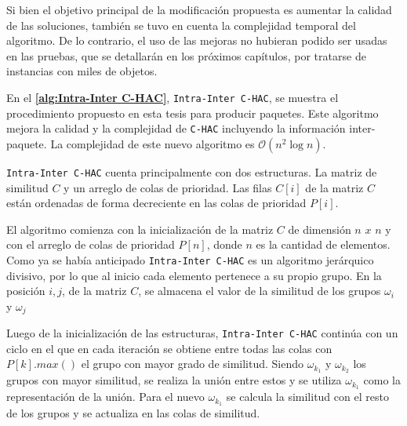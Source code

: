 Si bien el objetivo principal de la modificación propuesta es aumentar la calidad de las soluciones, también se tuvo en cuenta la complejidad temporal del algoritmo. De lo contrario, el uso de las mejoras no hubieran podido ser usadas en las pruebas, que se detallarán en los próximos capítulos, por tratarse de instancias con miles de objetos.

En el \textbf{\autoref{alg:Intra-Inter C-HAC}}, \texttt{Intra-Inter C-HAC}, se muestra el procedimiento propuesto en esta tesis para producir paquetes. Este algoritmo mejora la calidad y la complejidad de  \texttt{C-HAC} incluyendo la información inter-paquete. La complejidad de este nuevo algoritmo es $\mathcal{O}(n^{2}\log n)$. 

\texttt{Intra-Inter C-HAC} cuenta principalmente con dos estructuras. La matriz de similitud $C$ y un arreglo de colas de prioridad. Las filas $C\left[i\right]$ de la matriz $C$ están ordenadas de forma decreciente en las colas de prioridad $P\left[i\right]$.

El algoritmo comienza con la inicialización de la matriz $C$ de dimensión $n$ $x$ $n$ y con el arreglo de colas de prioridad $P\left[n\right]$, donde $n$ es la cantidad de elementos. Como ya se había anticipado \texttt{Intra-Inter C-HAC} es un algoritmo jerárquico divisivo, por lo que al inicio cada elemento pertenece a su propio grupo. En la posición $i,j$, de la matriz $C$, se almacena el valor de la similitud de los grupos $\omega_{i}$ y $\omega_{j}$

Luego de la inicialización de las estructuras, \texttt{Intra-Inter C-HAC} continúa con un ciclo en el que en cada iteración se obtiene entre todas las colas con $P\left[k\right].max()$ el grupo con mayor grado de similitud. Siendo $\omega_{k_{1}}$ y $\omega_{k_{2}}$ los grupos con mayor similitud, se realiza la unión entre estos y se utiliza $\omega_{k_{1}}$  como la representación de la unión. Para el nuevo  $\omega_{k_{1}}$ se calcula la similitud con el resto de los grupos y se actualiza en las colas de similitud.

